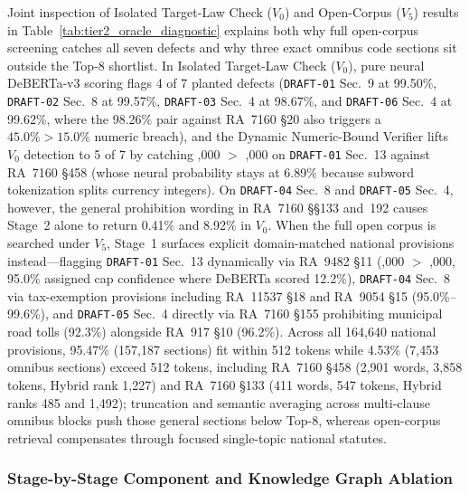Joint inspection of Isolated Target-Law Check ($V_0$) and Open-Corpus ($V_5$) results in Table~\ref{tab:tier2_oracle_diagnostic} explains both why full open-corpus screening catches all seven defects and why three exact omnibus code sections sit outside the Top-8 shortlist. In Isolated Target-Law Check ($V_0$), pure neural DeBERTa-v3 scoring flags 4 of 7 planted defects (\texttt{DRAFT-01} Sec.~9 at 99.50\%, \texttt{DRAFT-02} Sec.~8 at 99.57\%, \texttt{DRAFT-03} Sec.~4 at 98.67\%, and \texttt{DRAFT-06} Sec.~4 at 99.62\%, where the 98.26\% pair against RA~7160 \S20 also triggers a $45.0\% > 15.0\%$ numeric breach), and the Dynamic Numeric-Bound Verifier lifts $V_0$ detection to 5 of 7 by catching ,000 $>$ ,000 on \texttt{DRAFT-01} Sec.~13 against RA~7160 \S458 (whose neural probability stays at 6.89\% because subword tokenization splits currency integers). On \texttt{DRAFT-04} Sec.~8 and \texttt{DRAFT-05} Sec.~4, however, the general prohibition wording in RA~7160 \S\S133 and~192 causes Stage~2 alone to return 0.41\% and 8.92\% in $V_0$. When the full open corpus is searched under $V_5$, Stage~1 surfaces explicit domain-matched national provisions instead---flagging \texttt{DRAFT-01} Sec.~13 dynamically via RA~9482 \S11 (,000 $>$ ,000, 95.0\% assigned cap confidence where DeBERTa scored 12.2\%), \texttt{DRAFT-04} Sec.~8 via tax-exemption provisions including RA~11537 \S18 and RA~9054 \S15 (95.0\%--99.6\%), and \texttt{DRAFT-05} Sec.~4 directly via RA~7160 \S155 prohibiting municipal road tolls (92.3\%) alongside RA~917 \S10 (96.2\%). Across all 164,640 national provisions, 95.47\% (157,187 sections) fit within 512 tokens while 4.53\% (7,453 omnibus sections) exceed 512 tokens, including RA~7160 \S458 (2,901 words, 3,858 tokens, Hybrid rank 1,227) and RA~7160 \S133 (411 words, 547 tokens, Hybrid ranks 485 and 1,492); truncation and semantic averaging across multi-clause omnibus blocks push those general sections below Top-8, whereas open-corpus retrieval compensates through focused single-topic national statutes.

\subsubsection{Stage-by-Stage Component and Knowledge Graph Ablation}
\label{sec:tier2_graph_ablation}

